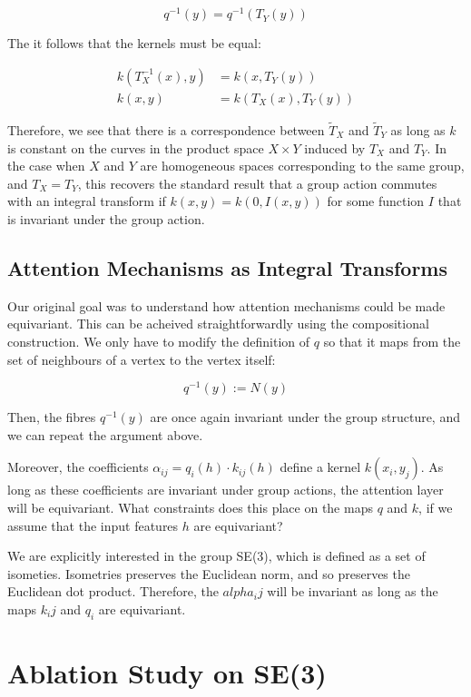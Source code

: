 \documentclass[11pt]{article}
\begin{document}
$$ q^{-1}(y) = q^{-1}(T_Y(y)) $$

The it follows that the kernels must be equal:

\begin{align*}
	k(T^{-1}_X(x), y) &= k(x, T_Y(y)) \\
	k(x, y) &= k(T_X(x), T_Y(y))
\end{align*}

Therefore, we see that there is a correspondence between $\tilde{T}_X$ and $\tilde{T}_Y$ as long as $k$ is constant on the curves in the product space $X \times Y$ induced by $T_X$ and $T_Y$. In the case when $X$ and $Y$ are homogeneous spaces corresponding to the same group, and $T_X = T_Y$, this recovers the standard result that a group action commutes with an integral transform if $k(x, y) = k(0, I(x,y))$ for some function $I$ that is invariant under the group action. 

\subsection*{Attention Mechanisms as Integral Transforms}

Our original goal was to understand how attention mechanisms could be made equivariant. This can be acheived straightforwardly using the compositional construction. We only have to modify the definition of $q$ so that it maps from the set of neighbours of a vertex to the vertex itself:

$$ q^{-1}(y) := N(y)$$

Then, the fibres $q^{-1}(y)$ are once again invariant under the group structure, and we can repeat the argument above.

Moreover, the coefficients $\alpha_{ij} = q_i (h) \cdot k_{ij} (h)$ define a kernel $k(x_i, y_j)$. As long as these coefficients are invariant under group actions, the attention layer will be equivariant. What constraints does this place on the maps $q$ and $k$, if we assume that the input features $h$ are equivariant? 

We are explicitly interested in the group SE(3), which is defined as a set of isometies. Isometries preserves the Euclidean norm, and so preserves the Euclidean dot product. Therefore, the $alpha_ij$ will be invariant as long as the maps $k_ij$ and $q_i$ are equivariant.


\section{Ablation Study on SE(3)}
\end{document}
